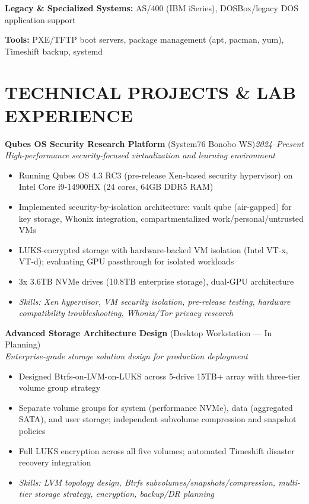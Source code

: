 \documentclass[9pt,letterpaper]{extarticle}
\begin{document}
\noindent\textbf{Legacy \& Specialized Systems:} AS/400 (IBM iSeries), DOSBox/legacy DOS application support

\noindent\textbf{Tools:} PXE/TFTP boot servers, package management (apt, pacman, yum), Timeshift backup, systemd

\section*{TECHNICAL PROJECTS \& LAB EXPERIENCE}

\noindent\textbf{Qubes OS Security Research Platform} (System76 Bonobo WS)\hfill\textit{2024--Present}\\
\textit{High-performance security-focused virtualization and learning environment}
\begin{itemize}[beginpenalty=10000, topsep=0pt]
  \item Running Qubes OS 4.3 RC3 (pre-release Xen-based security hypervisor) on Intel Core i9-14900HX (24 cores, 64GB DDR5 RAM)
  \item Implemented security-by-isolation architecture: vault qube (air-gapped) for key storage, Whonix integration, compartmentalized work/personal/untrusted VMs
  \item LUKS-encrypted storage with hardware-backed VM isolation (Intel VT-x, VT-d); evaluating GPU passthrough for isolated workloads
  \item 3x 3.6TB NVMe drives (10.8TB enterprise storage), dual-GPU architecture
  \item \textit{Skills: Xen hypervisor, VM security isolation, pre-release testing, hardware compatibility troubleshooting, Whonix/Tor privacy research}
\end{itemize}

\vspace{4pt}
\noindent\textbf{Advanced Storage Architecture Design} (Desktop Workstation --- In Planning)\\
\textit{Enterprise-grade storage solution design for production deployment}
\begin{itemize}
  \item Designed Btrfs-on-LVM-on-LUKS across 5-drive 15TB+ array with three-tier volume group strategy
  \item Separate volume groups for system (performance NVMe), data (aggregated SATA), and user storage; independent subvolume compression and snapshot policies
  \item Full LUKS encryption across all five volumes; automated Timeshift disaster recovery integration
  \item \textit{Skills: LVM topology design, Btrfs subvolumes/snapshots/compression, multi-tier storage strategy, encryption, backup/DR planning}
\end{itemize}
\end{document}
